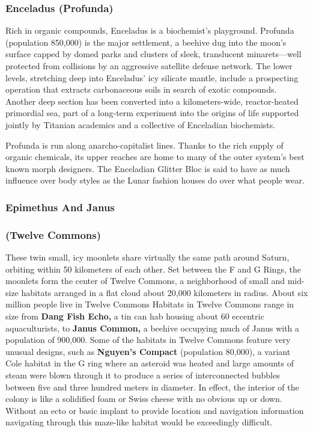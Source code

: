 \subsubsection{Enceladus (Profunda)}

Rich in organic compounds, Enceladus 
is a biochemist's playground. Profunda 
(population 850,000) is the major 
settlement, a beehive dug into the moon's 
surface capped by domed parks and clusters
of sleek, translucent minarets—well
protected from collisions by an aggressive
satellite defense network. The lower
levels, stretching deep into Enceladus' 
icy silicate mantle, include a prospecting 
operation that extracts carbonaceous soils 
in search of exotic compounds. Another 
deep section has been converted into a 
kilometers-wide, reactor-heated primordial
sea, part of a long-term experiment
into the origins of life supported jointly 
by Titanian academics and a collective of 
Enceladian biochemists.

Profunda is run along anarcho-capitalist
lines. Thanks to the rich supply of
organic chemicals, its upper reaches are 
home to many of the outer system's best 
known morph designers. The Enceladian 
Glitter Bloc is said to have as much influence
over body styles as the Lunar fashion
houses do over what people wear.

\subsubsection{Epimethus And Janus}


\subsubsection{(Twelve Commons)}

These twin small, icy moonlets share 
virtually the same path around Saturn, 
orbiting within 50 kilometers of each 
other. Set between the F and G Rings, 
the moonlets form the center of Twelve 
Commons, a neighborhood of small and 
mid-size habitats arranged in a flat cloud 
about 20,000 kilometers in radius. About 
six million people live in Twelve Commons
Habitats in Twelve Commons range
in size from \textbf{Dang Fish Echo,} a tin can hab 
housing about 60 eccentric aquaculturists, 
to \textbf{Janus Common,} a beehive occupying
much of Janus with a population of
900,000. Some of the habitats in Twelve 
Commons feature very unusual designs, 
such as \textbf{Nguyen's Compact} (population 
80,000), a variant Cole habitat in the 
G ring where an asteroid was heated 
and large amounts of steam were blown 
through it to produce a series of interconnected
bubbles between five and three
hundred meters in diameter. In effect, the 
interior of the colony is like a solidified 
foam or Swiss cheese with no obvious up 
or down. Without an ecto or basic implant 
to provide location and navigation information
navigating through this maze-like
habitat would be exceedingly difficult.

